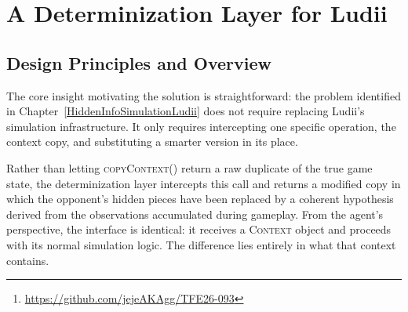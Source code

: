 \chapter{A Determinization Layer for Ludii}
\label{DeterminizationLayerLudii}

\begin{abstract}
The previous chapter demonstrated that native simulation-based agents in Ludii involuntarily access hidden game-state information through unrestricted context copies, producing artificially inflated performance figures in imperfect-information games. This chapter presents the solution developed in this thesis to address that problem.

The proposed approach introduces a determinization layer that intercepts simulation-time context copies, replaces hidden information with coherent hypotheses generated from past observations, and integrates transparently with any existing Ludii agent. The solution requires no modification to existing agent implementations and only a minimal, backward-compatible extension to the Ludii engine itself.

The chapter describes the architecture of the solution in full, covering hidden-information detection, game-history reconstruction, hypothesis generation, context injection, and agent integration.

The full implementation is available on \hyperlink{https://github.com/jejeAKAgg/TFE26-093}{GitHub}\footnote{\url{https://github.com/jejeAKAgg/TFE26-093}}, which includes the \LaTeX{} source for this thesis alongside the TAG and Ludii implementations as Git submodules.
\end{abstract}


\section{Design Principles and Overview}
\label{sec:solution_overview}

The core insight motivating the solution is straightforward: the problem identified in Chapter~\ref{HiddenInfoSimulationLudii} does not require replacing Ludii's simulation infrastructure. It only requires intercepting one specific operation, the context copy, and substituting a smarter version in its place.

Rather than letting \textsc{copyContext()} return a raw duplicate of the true game state, the determinization layer intercepts this call and returns a modified copy in which the opponent's hidden pieces have been replaced by a coherent hypothesis derived from the observations accumulated during gameplay. From the agent's perspective, the interface is identical: it receives a \textsc{Context} object and proceeds with its normal simulation logic. The difference lies entirely in what that context contains.

